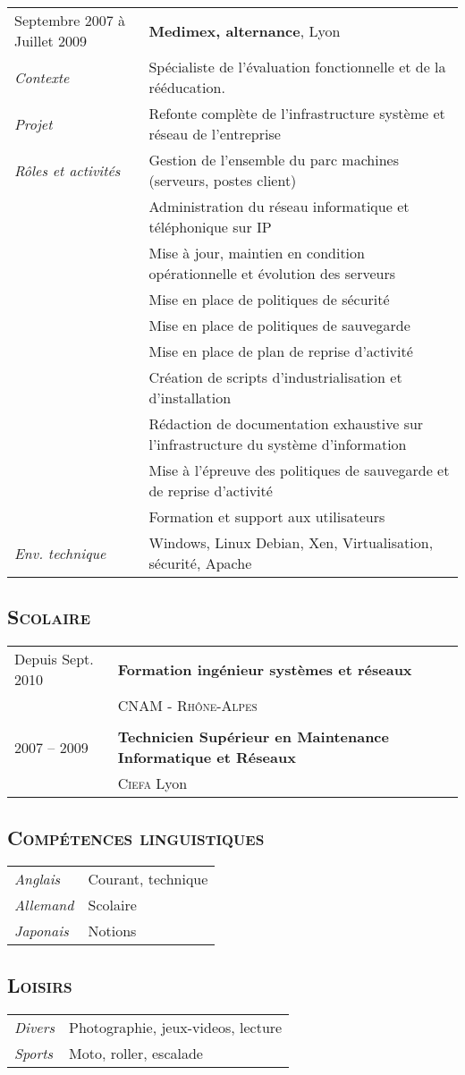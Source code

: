 \documentclass[a4paper,8pt]{article}
\newcommand{\hsubsection}[1]{\subsection*{\fontfamily{phv}\selectfont\textsc{#1}}}
\begin{document}
\begin{tabular}{P{3.5cm}|p{13cm}}
Septembre 2007 à Juillet 2009	& \textbf{Medimex, alternance}, Lyon\\
\textsl{Contexte}			& Spécialiste de l’évaluation fonctionnelle et de la rééducation.\\
\textsl{Projet}				& Refonte complète de l'infrastructure système et réseau de l'entreprise\\
\textsl{Rôles et activités} & Gestion de l'ensemble du parc machines (serveurs, postes client)\\
							& Administration du réseau informatique et téléphonique sur IP\\
							& Mise à jour, maintien en condition opérationnelle et évolution des serveurs\\
							& Mise en place de politiques de sécurité\\
							& Mise en place de politiques de sauvegarde\\
							& Mise en place de plan de reprise d'activité\\
							& Création de scripts d'industrialisation et d'installation\\
							& Rédaction de documentation exhaustive sur l'infrastructure du système d'information\\
							& Mise à l'épreuve des politiques de sauvegarde et de reprise d'activité\\
							& Formation et support aux utilisateurs\\
\textsl{Env. technique}		& Windows, Linux Debian, Xen, Virtualisation, sécurité, Apache\\
\end{tabular}

\hsubsection{Scolaire}
\begin{tabular}{P{3.5cm}|p{13cm}}
Depuis Sept. 2010		& \textbf{Formation ingénieur systèmes et réseaux}\\
	& \textsc{CNAM - Rhône-Alpes}\\
 & \\
2007 -- 2009 			& \textbf{Technicien Supérieur en Maintenance Informatique et Réseaux}\\
	& \textsc{Ciefa} Lyon\\
\end{tabular}

\hsubsection{Compétences linguistiques}
\begin{tabular}{P{3.5cm}|p{13cm}}
\textsl{Anglais}		& Courant, technique\\
\textsl{Allemand}		& Scolaire\\
\textsl{Japonais}		& Notions\\
\end{tabular}

\hsubsection{Loisirs}
\begin{tabular}{P{3.5cm}|p{13cm}}
\textsl{Divers}			& Photographie, jeux-videos, lecture\\
\textsl{Sports}			& Moto, roller, escalade\\
\end{tabular}
\end{document}
